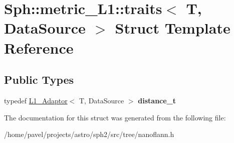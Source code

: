 \hypertarget{structSph_1_1metric__L1_1_1traits}{}\section{Sph\+:\+:metric\+\_\+\+L1\+:\+:traits$<$ T, Data\+Source $>$ Struct Template Reference}
\label{structSph_1_1metric__L1_1_1traits}
\subsection*{Public Types}
\begin{DoxyCompactItemize}
\item 
\hypertarget{structSph_1_1metric__L1_1_1traits_aacdc46864967d8eb5a4dc5d7ec5aa238}{}\label{structSph_1_1metric__L1_1_1traits_aacdc46864967d8eb5a4dc5d7ec5aa238} 
typedef \hyperlink{structSph_1_1L1__Adaptor}{L1\+\_\+\+Adaptor}$<$ T, Data\+Source $>$ {\bfseries distance\+\_\+t}
\end{DoxyCompactItemize}


The documentation for this struct was generated from the following file\+:\begin{DoxyCompactItemize}
\item 
/home/pavel/projects/astro/sph2/src/tree/nanoflann.\+h\end{DoxyCompactItemize}
